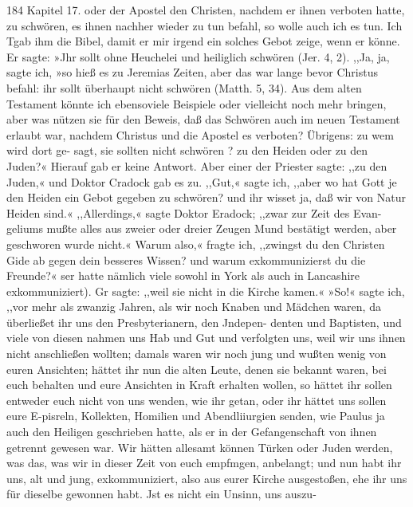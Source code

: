 184 Kapitel 17.
oder der Apostel den Christen, nachdem er ihnen verboten hatte,
zu schwören, es ihnen nachher wieder zu tun befahl, so wolle
auch ich es tun. Ich Tgab ihm die Bibel, damit er mir irgend
ein solches Gebot zeige, wenn er könne. Er sagte: »Jhr sollt
ohne Heuchelei und heiliglich schwören (Jer. 4, 2). ,,Ja, ja, sagte
ich, »so hieß es zu Jeremias Zeiten, aber das war lange bevor
Christus befahl: ihr sollt überhaupt nicht schwören (Matth. 5, 34).
Aus dem alten Testament könnte ich ebensoviele Beispiele oder vielleicht
noch mehr bringen, aber was nützen sie für den Beweis, daß das
Schwören auch im neuen Testament erlaubt war, nachdem Christus
und die Apostel es verboten? Übrigens: zu wem wird dort ge-
sagt, sie sollten nicht schwören ? zu den Heiden oder zu den Juden?«
Hierauf gab er keine Antwort. Aber einer der Priester sagte:
,,zu den Juden,« und Doktor Cradock gab es zu. ,,Gut,« sagte
ich, ,,aber wo hat Gott je den Heiden ein Gebot gegeben zu
schwören? und ihr wisset ja, daß wir von Natur Heiden sind.«
,,Allerdings,« sagte Doktor Eradock; ,,zwar zur Zeit des Evan-
geliums mußte alles aus zweier oder dreier Zeugen Mund bestätigt
werden, aber geschworen wurde nicht.« Warum also,« fragte ich,
,,zwingst du den Christen Gide ab gegen dein besseres Wissen?
und warum exkommunizierst du die Freunde?« ser hatte nämlich
viele sowohl in York als auch in Lancashire exkommuniziert). Gr
sagte: ,,weil sie nicht in die Kirche kamen.« »So!« sagte ich,
,,vor mehr als zwanzig Jahren, als wir noch Knaben und Mädchen
waren, da überließet ihr uns den Presbyterianern, den Jndepen-
denten und Baptisten, und viele von diesen nahmen uns Hab und
Gut und verfolgten uns, weil wir uns ihnen nicht anschließen
wollten; damals waren wir noch jung und wußten wenig
von euren Ansichten; hättet ihr nun die alten Leute, denen sie
bekannt waren, bei euch behalten und eure Ansichten in Kraft
erhalten wollen, so hättet ihr sollen entweder euch nicht von uns
wenden, wie ihr getan, oder ihr hättet uns sollen eure E-pisreln,
Kollekten, Homilien und Abendliiurgien senden, wie Paulus ja
auch den Heiligen geschrieben hatte, als er in der Gefangenschaft
von ihnen getrennt gewesen war. Wir hätten allesamt können
Türken oder Juden werden, was das, was wir in dieser Zeit von
euch empfmgen, anbelangt; und nun habt ihr uns, alt und jung,
exkommuniziert, also aus eurer Kirche ausgestoßen, ehe ihr uns für
dieselbe gewonnen habt. Jst es nicht ein Unsinn, uns auszu-


